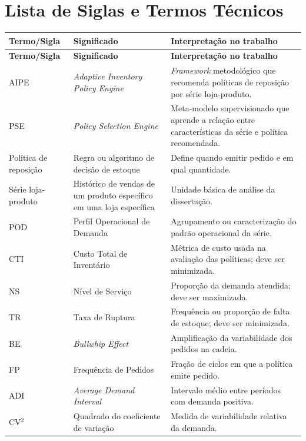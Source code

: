 \chapter*{Lista de Siglas e Termos Técnicos}

\begingroup
\scriptsize
\renewcommand{\arraystretch}{1.22}
\setlength{\tabcolsep}{3pt}
\begin{longtable}{@{}>{\raggedright\arraybackslash}p{2.35cm}>{\raggedright\arraybackslash}p{5.05cm}>{\raggedright\arraybackslash}p{7.15cm}@{}}
\toprule
\textbf{Termo/Sigla} & \textbf{Significado} & \textbf{Interpretação no trabalho} \\
\midrule
\endfirsthead
\toprule
\textbf{Termo/Sigla} & \textbf{Significado} & \textbf{Interpretação no trabalho} \\
\midrule
\endhead
\endfoot
AIPE & \textit{Adaptive Inventory Policy Engine} & \textit{Framework} metodológico que recomenda políticas de reposição por série loja-produto. \\
PSE & \textit{Policy Selection Engine} & Meta-modelo supervisionado que aprende a relação entre características da série e política recomendada. \\
Política de reposição & Regra ou algoritmo de decisão de estoque & Define quando emitir pedido e em qual quantidade. \\
Série loja-produto & Histórico de vendas de um produto específico em uma loja específica & Unidade básica de análise da dissertação. \\
POD & Perfil Operacional de Demanda & Agrupamento ou caracterização do padrão operacional da série. \\
CTI & Custo Total de Inventário & Métrica de custo usada na avaliação das políticas; deve ser minimizada. \\
NS & Nível de Serviço & Proporção da demanda atendida; deve ser maximizada. \\
TR & Taxa de Ruptura & Frequência ou proporção de falta de estoque; deve ser minimizada. \\
BE & \textit{Bullwhip Effect} & Amplificação da variabilidade dos pedidos na cadeia. \\
FP & Frequência de Pedidos & Fração de ciclos em que a política emite pedido. \\
ADI & \textit{Average Demand Interval} & Intervalo médio entre períodos com demanda positiva. \\
CV$^2$ & Quadrado do coeficiente de variação & Medida de variabilidade relativa da demanda. \\

\end{longtable}
